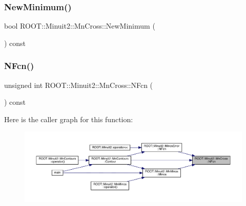 \subsubsection{\texorpdfstring{NewMinimum()}{NewMinimum()}\hspace{0.1cm}{\footnotesize\ttfamily [3/3]}}
{\footnotesize\ttfamily bool R\+O\+O\+T\+::\+Minuit2\+::\+Mn\+Cross\+::\+New\+Minimum (\begin{DoxyParamCaption}{ }\end{DoxyParamCaption}) const\hspace{0.3cm}{\ttfamily [inline]}}

\mbox{\label{classROOT_1_1Minuit2_1_1MnCross_a52cc0559ea27a2d8fe3f9961670e1544}} 
\subsubsection{\texorpdfstring{NFcn()}{NFcn()}\hspace{0.1cm}{\footnotesize\ttfamily [1/3]}}
{\footnotesize\ttfamily unsigned int R\+O\+O\+T\+::\+Minuit2\+::\+Mn\+Cross\+::\+N\+Fcn (\begin{DoxyParamCaption}{ }\end{DoxyParamCaption}) const\hspace{0.3cm}{\ttfamily [inline]}}

Here is the caller graph for this function\+:
\nopagebreak
\begin{figure}[H]
\begin{center}
\leavevmode
\includegraphics[width=350pt]{d3/db2/classROOT_1_1Minuit2_1_1MnCross_a52cc0559ea27a2d8fe3f9961670e1544_icgraph}
\end{center}
\end{figure}
\mbox{\label{classROOT_1_1Minuit2_1_1MnCross_a52cc0559ea27a2d8fe3f9961670e1544}} 
